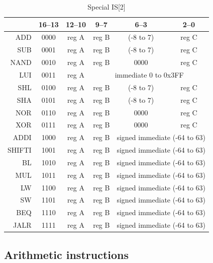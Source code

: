 \documentclass[10pt,a4paper]{article}
\theoremstyle{definition}%
\begin{document}
\begin{table}[ht!]
	\begin{center}
		\begin{tabular}{r|c|c|c|c|c}%
		\toprule
		\diaghead{bourage~}{Instr}{ bit}	& 16--13  & 12--10  & {9--7}  & 6--3  & {2--0}\\
		\midrule
		ADD & 0000 & reg A & reg B & (-8 to 7) & {reg C} \\
		SUB & 0001 & reg A & reg B & (-8 to 7) & {reg C} \\
		NAND & 0010 & reg A & reg B & 0000 & {reg C} \\ \cmidrule{4-6} %
		LUI & 0011 & reg A & \multicolumn{3}{c}{immediate 0 to 0x3FF} \\ %
		\cmidrule{4-6}
		SHL & 0100 & reg A & reg B & (-8 to 7) & {reg C} \\
		SHA & 0101 & reg A & reg B & (-8 to 7) & {reg C} \\
		NOR & 0110 & reg A & reg B & 0000 & {reg C} \\
		XOR & 0111 & reg A & reg B & 0000 & {reg C} \\
		\cmidrule{5-6}
		ADDI & 1000 & reg A & reg B & \multicolumn{2}{c}{signed immediate (-64 to 63)} \\
		SHIFTI & 1001 & reg A & reg B & \multicolumn{2}{c}{signed immediate (-64 to 63)} \\
		BL & 1010 & reg A & reg B & \multicolumn{2}{c}{signed immediate (-64 to 63)} \\
		MUL & 1011 & reg A & reg B & \multicolumn{2}{c}{signed immediate (-64 to 63)} \\
		LW& 1100 & reg A & reg B & \multicolumn{2}{c}{signed immediate (-64 to 63)} \\
		SW& 1101 & reg A & reg B & \multicolumn{2}{c}{signed immediate (-64 to 63)} \\
		BEQ & 1110 & reg A & reg B & \multicolumn{2}{c}{signed immediate (-64 to 63)} \\
		JALR & 1111 & reg A & reg B & \multicolumn{2}{c}{signed immediate (-64 to 63)} \\
		\bottomrule
		\end{tabular}
	\end{center}
\caption{Special IS[2]}
\label{tab:IS2}
\end{table}

\clearpage
\subsection{Arithmetic instructions}
\end{document}
